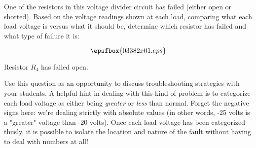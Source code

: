 

One of the resistors in this voltage divider circuit has failed (either open or shorted).  Based on the voltage readings shown at each load, comparing what each load voltage is versus what it should be, determine which resistor has failed and what type of failure it is:

$$\epsfbox{03382x01.eps}$$







Resistor $R_4$ has failed open.







Use this question as an opportunity to discuss troubleshooting strategies with your students.  A helpful hint in dealing with this kind of problem is to categorize each load voltage as either being {\it greater} or {\it less} than normal.  Forget the negative signs here: we're dealing strictly with absolute values (in other words, -25 volts is a "greater" voltage than -20 volts).  Once each load voltage has been categorized thusly, it is possible to isolate the location and nature of the fault without having to deal with numbers at all!




